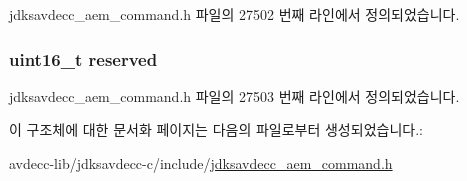 jdksavdecc\+\_\+aem\+\_\+command.\+h 파일의 27502 번째 라인에서 정의되었습니다.

\subsubsection[{\texorpdfstring{reserved}{reserved}}]{\setlength{\rightskip}{0pt plus 5cm}uint16\+\_\+t reserved}\hypertarget{structjdksavdecc__aem__command__get__audio__map_a5a6ed8c04a3db86066924b1a1bf4dad3}{}\label{structjdksavdecc__aem__command__get__audio__map_a5a6ed8c04a3db86066924b1a1bf4dad3}


jdksavdecc\+\_\+aem\+\_\+command.\+h 파일의 27503 번째 라인에서 정의되었습니다.



이 구조체에 대한 문서화 페이지는 다음의 파일로부터 생성되었습니다.\+:\begin{DoxyCompactItemize}
\item 
avdecc-\/lib/jdksavdecc-\/c/include/\hyperlink{jdksavdecc__aem__command_8h}{jdksavdecc\+\_\+aem\+\_\+command.\+h}\end{DoxyCompactItemize}
